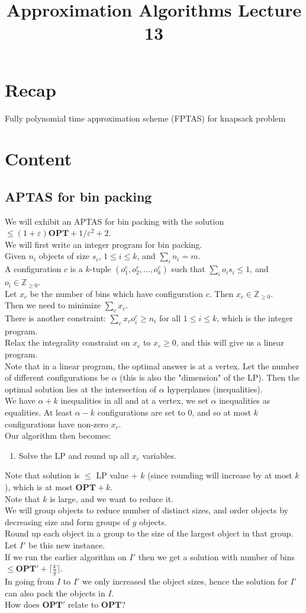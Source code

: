 \documentclass[a4paper]{article}
\title{\textbf{Approximation Algorithms Lecture 13}}
\date{}
\newcommand{\nl}{\vspace{0.2cm}\\}
\newcommand{\eps}{\varepsilon}
\newcommand{\Z}{\mathbb{Z}}
\newcommand{\OPT}{\mathbf{OPT}}
\begin{document}
\maketitle
\tableofcontents

\section{Recap}

Fully polynomial time approximation scheme (FPTAS) for knapsack problem

\section{Content}

\subsection{APTAS for bin packing}

We will exhibit an APTAS for bin packing with the solution $\le (1 + \eps) \OPT + 1/\eps^2 + 2$.\nl
We will first write an integer program for bin packing.\nl
Given $n_i$ objects of size $s_i$, $1 \le i \le k$, and $\sum_i n_i = m$.\nl
A configuration $c$ is a $k$-tuple $(o_1^c, o_2^c, \ldots, o_k^c)$ such that $\sum_i o_i s_i \le 1$, and $o_i \in \Z_{\ge 0}$.\nl
Let $x_c$ be the number of bins which have configuration $c$. Then $x_c \in \Z_{\ge 0}$.\nl
Then we need to minimize $\sum_{c} x_c$.\nl
There is another constraint: $\sum_{c} x_c o_i^c \ge n_i$ for all $1 \le i \le k$, which is the integer program.\nl
Relax the integrality constraint on $x_c$ to $x_c \ge 0$, and this will give us a linear program.\nl
Note that in a linear program, the optimal answer is at a vertex.
Let the number of different configurations be $\alpha$ (this is also the "dimension" of the LP). Then the optimal solution lies at the intersection of $\alpha$ hyperplanes (inequalities).\nl
We have $\alpha + k$ inequalities in all and at a vertex, we set $\alpha$ inequalities as equalities. At least $\alpha - k$ configurations are set to $0$, and so at most $k$ configurations have
non-zero $x_c$.\nl
Our algorithm then becomes:
\begin{enumerate}
    \item Solve the LP and round up all $x_c$ variables.
\end{enumerate}
Note that solution is $\le$ LP value + $k$ (since rounding will increase by at most $k$), which is at most $\OPT + k$.\nl
Note that $k$ is large, and we want to reduce it.\nl
We will group objects to reduce number of distinct sizes, and order objects by decreasing size and form groups of $g$ objects.\nl
Round up each object in a group to the size of the largest object in that group.\nl
Let $I'$ be this new instance.\nl
If we run the earlier algorithm on $I'$ then we get a solution with number of bins $\le \OPT' + \lceil\frac{k}{g}\rceil$.\nl
In going from $I$ to $I'$ we only increased the object sizes, hence the solution for $I'$ can also pack the objects in $I$.\nl
How does $\OPT'$ relate to $\OPT$?\nl
\end{document}
